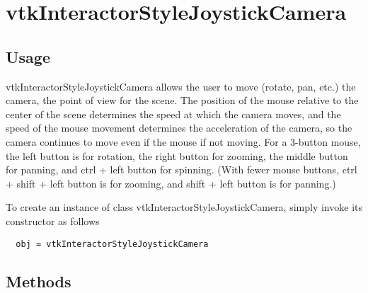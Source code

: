 \section{vtkInteractorStyleJoystickCamera}

\subsection{Usage}

 vtkInteractorStyleJoystickCamera allows the user to move (rotate, pan,
 etc.) the camera, the point of view for the scene.  The position of the
 mouse relative to the center of the scene determines the speed at which
 the camera moves, and the speed of the mouse movement determines the
 acceleration of the camera, so the camera continues to move even if the
 mouse if not moving.
 For a 3-button mouse, the left button is for rotation, the right button
 for zooming, the middle button for panning, and ctrl + left button for
 spinning.  (With fewer mouse buttons, ctrl + shift + left button is
 for zooming, and shift + left button is for panning.)

To create an instance of class vtkInteractorStyleJoystickCamera, simply
invoke its constructor as follows
\begin{verbatim}
  obj = vtkInteractorStyleJoystickCamera
\end{verbatim}
\subsection{Methods}

